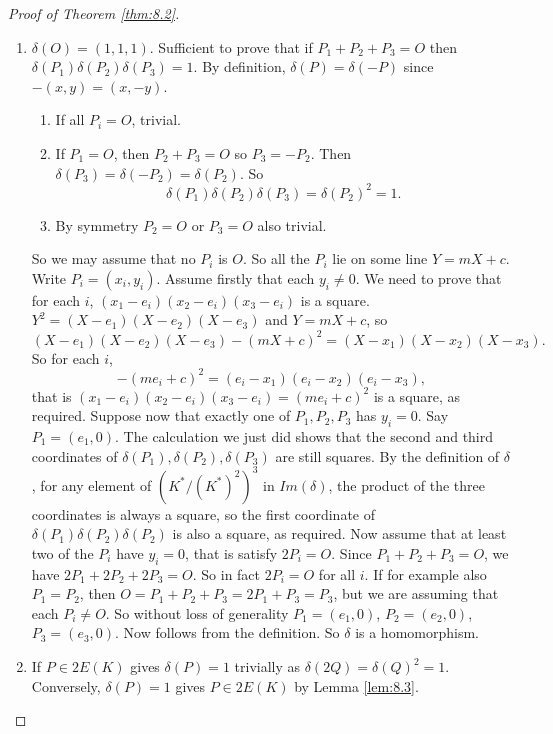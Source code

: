 \documentclass{article}
\newcommand{\rb}[1]{\left( #1 \right)}
\theoremstyle{definition}\newtheorem{definition}{Definition}[section]
\theoremstyle{definition}\newtheorem{remark}[definition]{Remark}
\theoremstyle{definition}\newtheorem*{example}{Example}
\theoremstyle{definition}\newtheorem*{note}{Note}
\begin{document}
\begin{proof}[Proof of Theorem \ref{thm:8.2}]
\hfill
\begin{enumerate}
\item $ \delta\rb{O} = \rb{1, 1, 1} $. Sufficient to prove that if $ P_1 + P_2 + P_3 = O $ then $ \delta\rb{P_1}\delta\rb{P_2}\delta\rb{P_3} = 1 $. By definition, $ \delta\rb{P} = \delta\rb{-P} $ since $ -\rb{x, y} = \rb{x, -y} $.
\begin{enumerate}
\item If all $ P_i = O $, trivial.
\item If $ P_1 = O $, then $ P_2 + P_3 = O $ so $ P_3 = -P_2 $. Then $ \delta\rb{P_3} = \delta\rb{-P_2} = \delta\rb{P_2} $. So
$$ \delta\rb{P_1}\delta\rb{P_2}\delta\rb{P_3} = \delta\rb{P_2}^2 = 1. $$
\item By symmetry $ P_2 = O $ or $ P_3 = O $ also trivial.
\end{enumerate}
So we may assume that no $ P_i $ is $ O $. So all the $ P_i $ lie on some line $ Y = mX + c $. Write $ P_i = \rb{x_i, y_i} $. Assume firstly that each $ y_i \ne 0 $. We need to prove that for each $ i $, $ \rb{x_1 - e_i}\rb{x_2 - e_i}\rb{x_3 - e_i} $ is a square. $ Y^2 = \rb{X - e_1}\rb{X - e_2}\rb{X - e_3} $ and $ Y = mX + c $, so
$$ \rb{X - e_1}\rb{X - e_2}\rb{X - e_3} - \rb{mX + c}^2 = \rb{X - x_1}\rb{X - x_2}\rb{X - x_3}. $$
So for each $ i $,
$$ -\rb{me_i + c}^2 = \rb{e_i - x_1}\rb{e_i - x_2}\rb{e_i - x_3}, $$
that is $ \rb{x_1 - e_i}\rb{x_2 - e_i}\rb{x_3 - e_i} = \rb{me_i + c}^2 $ is a square, as required. Suppose now that exactly one of $ P_1, P_2, P_3 $ has $ y_i = 0 $. Say $ P_1 = \rb{e_1, 0} $. The calculation we just did shows that the second and third coordinates of $ \delta\rb{P_1}, \delta\rb{P_2}, \delta\rb{P_3} $ are still squares. By the definition of $ \delta $, for any element of $ \rb{K^* / \rb{K^*}^2}^3 $ in $ Im\rb{\delta} $, the product of the three coordinates is always a square, so the first coordinate of $ \delta\rb{P_1}\delta\rb{P_2}\delta\rb{P_2} $ is also a square, as required. Now assume that at least two of the $ P_i $ have $ y_i = 0 $, that is satisfy $ 2P_i = O $. Since $ P_1 + P_2 + P_3 = O $, we have $ 2P_1 + 2P_2 + 2P_3 = O $. So in fact $ 2P_i = O $ for all $ i $. If for example also $ P_1 = P_2 $, then $ O = P_1 + P_2 + P_3 = 2P_1 + P_3 = P_3 $, but we are assuming that each $ P_i \ne O $. So without loss of generality $ P_1 = \rb{e_1, 0} $, $ P_2 = \rb{e_2, 0} $, $ P_3 = \rb{e_3, 0} $. Now follows from the definition. So $ \delta $ is a homomorphism.
\item If $ P \in 2E\rb{K} $ gives $ \delta\rb{P} = 1 $ trivially as $ \delta\rb{2Q} = \delta\rb{Q}^2 = 1 $. Conversely, $ \delta\rb{P} = 1 $ gives $ P \in 2E\rb{K} $ by Lemma \ref{lem:8.3}.
\end{enumerate}
\end{proof}
\end{document}
